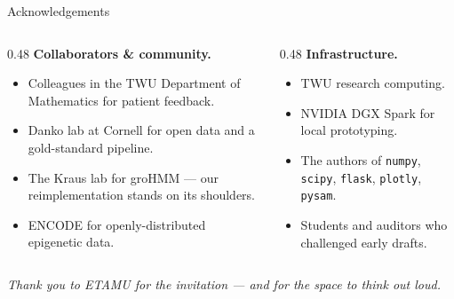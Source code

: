 \documentclass[aspectratio=169,11pt]{beamer}
\begin{document}
\begin{frame}{Acknowledgements}
\vspace{0.3em}
\begin{columns}[T,onlytextwidth]
\begin{column}{0.48\textwidth}
  {\color{KGold}\bfseries\small Collaborators \& community.}
  \begin{itemize}
    \setlength{\itemsep}{0.2em}
    \item Colleagues in the TWU Department of Mathematics for patient feedback.
    \item Danko lab at Cornell for open data and a gold-standard pipeline.
    \item The Kraus lab for groHMM --- our reimplementation stands on its shoulders.
    \item ENCODE for openly-distributed epigenetic data.
  \end{itemize}
\end{column}
\begin{column}{0.48\textwidth}
  {\color{KGold}\bfseries\small Infrastructure.}
  \begin{itemize}
    \setlength{\itemsep}{0.2em}
    \item TWU research computing.
    \item NVIDIA DGX Spark for local prototyping.
    \item The authors of \texttt{numpy}, \texttt{scipy}, \texttt{flask}, \texttt{plotly}, \texttt{pysam}.
    \item Students and auditors who challenged early drafts.
  \end{itemize}
\end{column}
\end{columns}
\vspace{1em}
\begin{center}
  {\color{KCream}\itshape Thank you to ETAMU for the invitation --- and for the space to think out loud.}
\end{center}
\end{frame}
\end{document}
